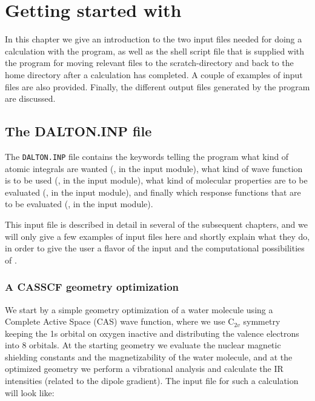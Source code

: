 \chapter{Getting started with {\dalton}}\label{ch:starting}

In this chapter we give an introduction to the two input files needed
for doing a calculation with the {\dalton} program, as well as the
shell script file that is supplied with the program for moving
relevant files to the scratch-directory and back to the home directory
after a calculation has completed. A couple of examples of
input files  are also provided. Finally, the different output files
generated by the program are discussed.

\section{The DALTON.INP file}\label{sec:daltoninp}

The \verb|DALTON.INP| file contains the keywords telling the program
what kind of atomic integrals are wanted
({\her}, in the  input module), what kind of wave
function is to be used ({\sir}, in the
 input
module), what kind of molecular properties  are
to be evaluated (\aba , in the  input module), and
finally which response functions that are to
be evaluated (\resp , in
the  input module).

This input file is described in detail in several of the subsequent chapters,
and we will  only give a few examples of input files here and shortly
explain what they do, in order to give the user a flavor of the input
and the computational possibilities
of {\dalton}.

\subsection{A CASSCF geometry optimization}

We start by a simple geometry optimization 
of a water molecule using a Complete 
Active Space (CAS) wave function, where we use C$_{2v}$ symmetry
keeping the 1s orbital on oxygen inactive and distributing the valence
electrons  into 8 orbitals. At the starting geometry we
evaluate the nuclear magnetic shielding constants 
and the magnetizability of the water
molecule, and at the optimized geometry we perform a vibrational
analysis and calculate the IR
intensities 
(related to the dipole
gradient). The input file for such a calculation will look like:


